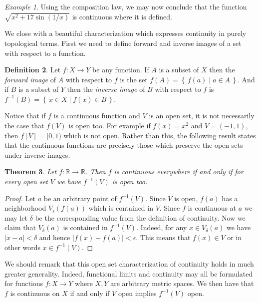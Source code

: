 \documentclass[11pt,oneside]{amsbook}
\newcommand{\set}[1]{\left\{\,#1\,\right\}}
\newcommand{\RR}{\mathbb R}
\theoremstyle{definition}
\theoremstyle{plain}
\newtheorem{thm}{Theorem}[section]
\theoremstyle{definition}
\newtheorem{defn}[thm]{Definition}
\theoremstyle{remark}
\newtheorem{example}[thm]{Example}
\numberwithin{equation}{section}
\numberwithin{figure}{section}
\begin{document}
\begin{example}
  Using the composition law, we may now conclude that the function $\sqrt{x^2+17\sin(1/x)}$ is continuous where it is defined.
\end{example}

We close with a beautiful characterization which expresses continuity in purely topological terms. First we need to define forward and inverse images of a set with respect to a function.

\begin{defn}
  Let $f\colon X\to Y$ be any function. If $A$ is a subset of $X$ then the \emph{forward image} of $A$ with respect to $f$ is the set $f(A)=\set{f(a)\mid a\in A}$. And if $B$ is a subset of $Y$ then the \emph{inverse image} of $B$ with respect to $f$ is $f^{-1}(B)=\set{x\in X\mid f(x)\in B}$.
\end{defn}

Notice that if $f$ is a continuous function and $V$ is an open set, it is not necessarily the case that $f(V)$ is open too. For example if $f(x)=x^2$ and $V=(-1,1)$, then $f[V]=[0,1)$ which is not open. Rather than this, the following result states that the continuous functions are precisely those which preserve the open sets under inverse images.

\begin{thm}
  Let $f\colon\RR\to\RR$. Then $f$ is continuous everywhere if and only if for every open set $V$ we have $f^{-1}(V)$ is open too.
\end{thm}

\begin{proof}
  Let $a$ be an arbitrary point of $f^{-1}(V)$. Since $V$ is open, $f(a)$ has a neighborhood $V_\epsilon(f(a))$ which is contained in $V$. Since $f$ is continuous at $a$ we may let $\delta$ be the corresponding value from the definition of continuity. Now we claim that $V_\delta(a)$ is contained in $f^{-1}(V)$. Indeed, for any $x\in V_\delta(a)$ we have $|x-a|<\delta$ and hence $|f(x)-f(a)|<\epsilon$. This means that $f(x)\in V$ or in other words $x\in f^{-1}(V)$.
\end{proof}

We should remark that this open set characterization of continuity holds in much greater generality. Indeed, functional limits and continuity may all be formulated for functions $f\colon X\to Y$ where $X,Y$ are arbitrary metric spaces. We then have that $f$ is continuous on $X$ if and only if $V$ open implies $f^{-1}(V)$ open.

\newpage
\end{document}
